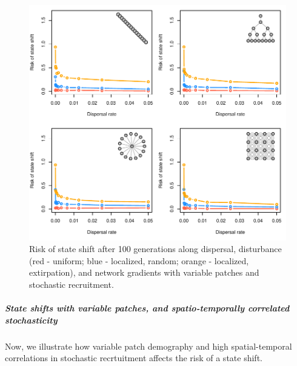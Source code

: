 \documentclass[]{article}
\let\oldsubparagraph\subparagraph
\renewcommand{\subparagraph}[1]{\oldsubparagraph{#1}\mbox{}}
\begin{document}
\begin{figure}[H]

{\centering \includegraphics{Managing_for_ecological_surprises_in_metapopulations_makeHTML_files/figure-latex/state shift with variable patches and stochasticity-1} 

}

\caption{Risk of state shift after 100 generations along dispersal, disturbance (red - uniform; blue - localized, random; orange - localized, extirpation), and network gradients with variable patches and stochastic recruitment.}\label{fig:state shift with variable patches and stochasticity}
\end{figure}

\hypertarget{state-shifts-with-variable-patches-and-spatio-temporally-correlated-stochasticity}{%
\subparagraph{State shifts with variable patches, and spatio-temporally
correlated
stochasticity}\label{state-shifts-with-variable-patches-and-spatio-temporally-correlated-stochasticity}}

Now, we illustrate how variable patch demography and high
spatial-temporal correlations in stochastic recrtuitment affects the
risk of a state shift.
\end{document}
